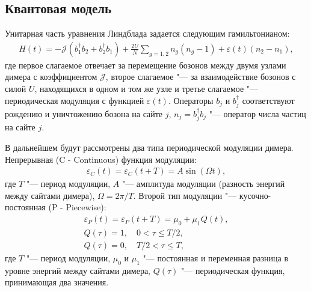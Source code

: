 \subsection{Квантовая модель}\label{subsec:ch3/dimer/quantum}

Унитарная часть уравнения Линдблада  задается следующим гамильтонианом:
\begin{equation}
	\label{eq:dimer_H}
	\begin{gathered}
		H(t) = -\mathcal{J} \left(b^\dagger_1 b_2 + b^\dagger_2 b_1\right) + \frac{2 U}{N} \sum_{g=1,2} n_g \left(n_g - 1\right) + \varepsilon(t) \left(n_2 - n_1\right),
	\end{gathered}
\end{equation}
где первое слагаемое отвечает за перемещение бозонов между двумя узлами димера с коэффициентом \(\mathcal{J}\), второе слагаемое "--- за взаимодействие бозонов с силой \(U\), находящихся в  одном и том же узле и третье слагаемое "--- периодическая модуляция с функцией \(\varepsilon(t)\). 
Операторы \(b_j\) и \(b^\dagger_j\) соответствуют рождению и уничтожению бозона на сайте \(j\), \(n_j = b^\dagger_j b_j\) "--- оператор числа частиц на сайте \(j\).

В дальнейшем будут рассмотрены два типа периодической модуляции димера.
Непрерывная (C - Continuous) функция модуляции:
\begin{equation}
	\label{eq:dimer_mod_c}
	\begin{gathered}
		\varepsilon_{C}(t) = \varepsilon_{C}(t + T) = A \sin(\Omega t),
	\end{gathered}
\end{equation}
где \(T\) "--- период модуляции, \(A\) "--- амплитуда модуляции (разность энергий между сайтами димера), \(\Omega = 2 \pi / T\).
Второй тип модуляции "--- кусочно-постоянная (P - Piecewise):
\begin{equation}
	\label{eq:dimer_mod_p}
	\begin{gathered}
		\varepsilon_{P}(t) = \varepsilon_{P}(t + T) = \mu_0 + \mu_1 Q(t), \\
		Q(\tau) = 1, \quad 0 < \tau \le T/2, \\
		Q(\tau) = 0, \quad T/2 < \tau \le T,
	\end{gathered}
\end{equation}
где \(T\) "--- период модуляции, \(\mu_0\) и \(\mu_1\) "--- постоянная и переменная разница в уровне энергий между сайтами димера, \(Q(\tau)\) "--- периодическая функция, принимающая два значения.

